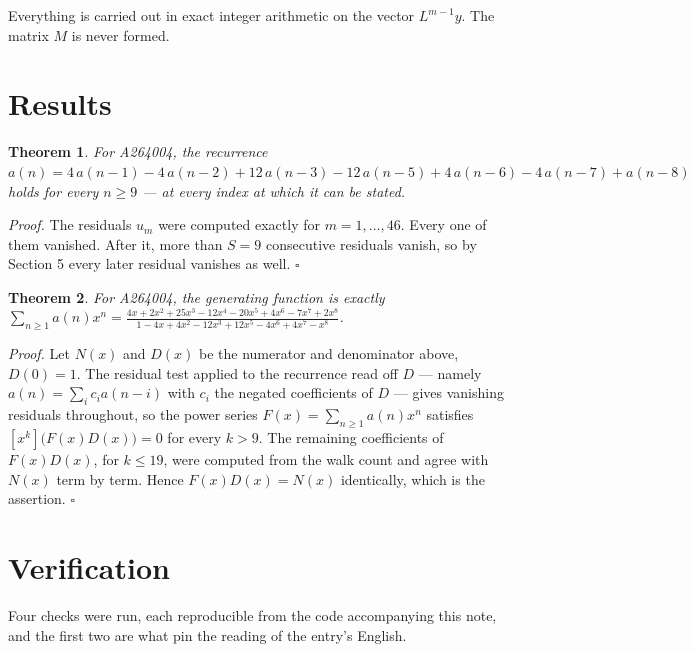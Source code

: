 \documentclass[11pt]{article}
\newtheorem{theorem}{Theorem}
\theoremstyle{definition}
\begin{document}
Everything is carried out in exact integer arithmetic on the vector $L^{m-1}y$. The matrix $M$ is never formed.

\section{Results}

\begin{theorem} For A264004, the recurrence $a(n) = 4\,a(n-1) - 4\,a(n-2) + 12\,a(n-3) - 12\,a(n-5) + 4\,a(n-6) - 4\,a(n-7) + a(n-8)$ holds for every $n \ge 9$ --- at every index at which it can be stated.\end{theorem}

{\itshape Proof.} The residuals $u_m$ were computed exactly for $m = 1,\dots,46$. Every one of them vanished. After it, more than $S = 9$ consecutive residuals vanish, so by Section 5 every later residual vanishes as well. $\square$

\begin{theorem} For A264004, the generating function is exactly $\sum_{n\ge 1} a(n)x^n = \frac{4x + 2x^{2} + 25x^{3} - 12x^{4} - 20x^{5} + 4x^{6} - 7x^{7} + 2x^{8}}{1 - 4x + 4x^{2} - 12x^{3} + 12x^{5} - 4x^{6} + 4x^{7} - x^{8}}$.\end{theorem}

{\itshape Proof.} Let $N(x)$ and $D(x)$ be the numerator and denominator above, $D(0)=1$. The residual test applied to the recurrence read off $D$ --- namely $a(n) = \sum_i c_i a(n-i)$ with $c_i$ the negated coefficients of $D$ --- gives vanishing residuals throughout, so the power series $F(x)=\sum_{n\ge 1}a(n)x^n$ satisfies $[x^k]\bigl(F(x)D(x)\bigr) = 0$ for every $k > 9$. The remaining coefficients of $F(x)D(x)$, for $k \le 19$, were computed from the walk count and agree with $N(x)$ term by term. Hence $F(x)D(x) = N(x)$ identically, which is the assertion. $\square$

\section{Verification}

Four checks were run, each reproducible from the code accompanying this note, and the first two are what pin the reading of the entry's English.
\end{document}
